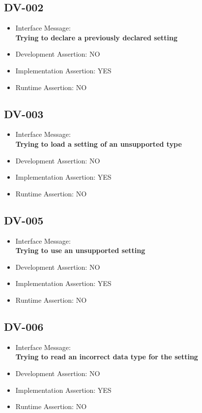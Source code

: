\subsection{DV-002}
\begin{itemize}
  \item Interface Message:\\[1em]\textbf{Trying to declare a previously declared setting}
  \item Development Assertion: NO
  \item Implementation Assertion: YES
  \item Runtime Assertion: NO
\end{itemize}

\subsection{DV-003}
\begin{itemize}
  \item Interface Message:\\[1em]\textbf{Trying to load a setting of an unsupported type}
  \item Development Assertion: NO
  \item Implementation Assertion: YES
  \item Runtime Assertion: NO
\end{itemize}

\subsection{DV-005}
\begin{itemize}
  \item Interface Message:\\[1em]\textbf{Trying to use an unsupported setting}
  \item Development Assertion: NO
  \item Implementation Assertion: YES
  \item Runtime Assertion: NO
\end{itemize}

\subsection{DV-006}
\begin{itemize}
  \item Interface Message:\\[1em]\textbf{Trying to read an incorrect data type for the setting}
  \item Development Assertion: NO
  \item Implementation Assertion: YES
  \item Runtime Assertion: NO
\end{itemize}

